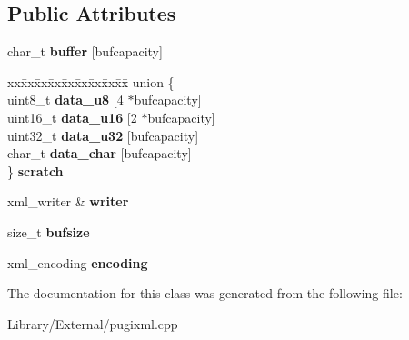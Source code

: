 \subsection*{Public Attributes}
\begin{DoxyCompactItemize}
\item 
\hypertarget{classxml__buffered__writer_a84c87765fbdf444d981ffb0f67899dd4}{}char\+\_\+t {\bfseries buffer} \mbox{[}bufcapacity\mbox{]}\label{classxml__buffered__writer_a84c87765fbdf444d981ffb0f67899dd4}

\item 
\hypertarget{classxml__buffered__writer_abcaceaad35073ff67745b6091e46d61b}{}\begin{tabbing}
xx\=xx\=xx\=xx\=xx\=xx\=xx\=xx\=xx\=\kill
union \{\\
\>uint8\_t {\bfseries data\_u8} \mbox{[}4 $\ast$bufcapacity\mbox{]}\\
\>uint16\_t {\bfseries data\_u16} \mbox{[}2 $\ast$bufcapacity\mbox{]}\\
\>uint32\_t {\bfseries data\_u32} \mbox{[}bufcapacity\mbox{]}\\
\>char\_t {\bfseries data\_char} \mbox{[}bufcapacity\mbox{]}\\
\} {\bfseries scratch}\label{classxml__buffered__writer_abcaceaad35073ff67745b6091e46d61b}
\\

\end{tabbing}\item 
\hypertarget{classxml__buffered__writer_a37cdd45f867937e1978565f5a0fa318b}{}xml\+\_\+writer \& {\bfseries writer}\label{classxml__buffered__writer_a37cdd45f867937e1978565f5a0fa318b}

\item 
\hypertarget{classxml__buffered__writer_a6bad6a93035d796939d84bee30e74ce7}{}size\+\_\+t {\bfseries bufsize}\label{classxml__buffered__writer_a6bad6a93035d796939d84bee30e74ce7}

\item 
\hypertarget{classxml__buffered__writer_ab810a7286598172e1549561b285f08fb}{}xml\+\_\+encoding {\bfseries encoding}\label{classxml__buffered__writer_ab810a7286598172e1549561b285f08fb}

\end{DoxyCompactItemize}


The documentation for this class was generated from the following file\+:\begin{DoxyCompactItemize}
\item 
Library/\+External/pugixml.\+cpp\end{DoxyCompactItemize}
